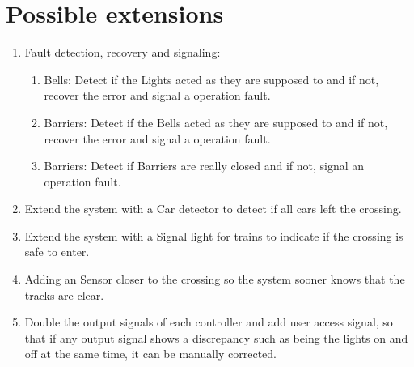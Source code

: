 \documentclass[final]{report}
\begin{document}
\section{Possible extensions}
	\begin{enumerate}
	\item Fault detection, recovery and signaling:
		\begin{enumerate}
			\item Bells: Detect if the Lights acted as they are supposed to and if not, recover the error and signal a operation fault.
			\item Barriers: Detect if the Bells acted as they are supposed to and if not, recover the error and signal a operation fault.
			\item Barriers: Detect if Barriers are really closed and if not, signal an operation fault.
		\end{enumerate}

	\item Extend the system with a Car detector to detect if all cars left the crossing.
	\item Extend the system with a Signal light for trains to indicate if the crossing is safe to enter.
	\item Adding an Sensor closer to the crossing so the system sooner knows that the tracks are clear.
	\item Double the output signals of each controller and add user access signal, so that if any output signal shows a discrepancy such as being the lights on and off at the same time, it can be manually corrected.

	\end{enumerate}
\end{document}
